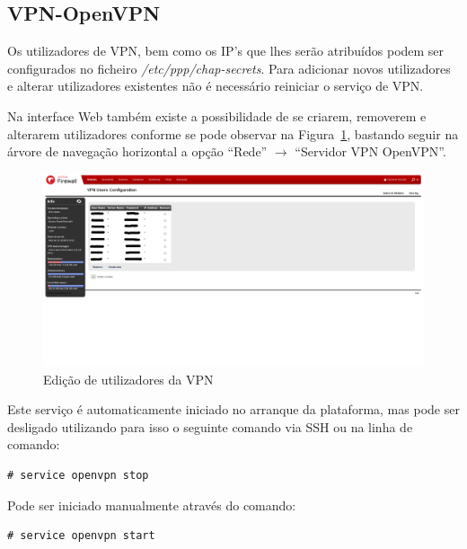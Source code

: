 \subsection*{VPN-OpenVPN}

Os utilizadores de VPN, bem como os IP's que lhes serão atribuídos podem ser
configurados no ficheiro \emph{/etc/ppp/chap-secrets}.
Para adicionar novos utilizadores e alterar utilizadores existentes não é necessário reiniciar o serviço de VPN.

Na interface Web também existe a possibilidade de se criarem, removerem e alterarem
utilizadores conforme se pode observar na Figura~\ref{fig:vpn}, bastando seguir na árvore de navegação horizontal a opção ``Rede'' $\rightarrow$ ``Servidor VPN OpenVPN''.

\begin{figure}[H]
\begin{center}
\includegraphics[width=15cm]{include/img/vpn}
\end{center}
\caption{Edição de utilizadores da VPN}
\label{fig:vpn}
\end{figure}

Este serviço é automaticamente iniciado no arranque da plataforma, mas pode ser desligado utilizando para isso o seguinte comando via SSH ou na linha de comando:

\begin{verbatim}
# service openvpn stop
\end{verbatim}

Pode ser iniciado manualmente através do comando:

\begin{verbatim}
# service openvpn start
\end{verbatim}
